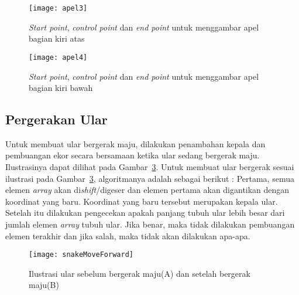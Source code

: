 \begin{figure}[H]
	\centering  
	\texttt{[image: apel3]}  
	\caption[\textit{Start point}, \textit{control point} dan \textit{end point} untuk menggambar apel bagian kiri atas]{\textit{Start point}, \textit{control point} dan \textit{end point} untuk menggambar apel bagian kiri atas}
	\label{fig:apel3} 
\end{figure}

\begin{figure}[H]
	\centering  
	\texttt{[image: apel4]}  
	\caption[\textit{Start point}, \textit{control point} dan \textit{end point} untuk menggambar apel bagian kiri bawah]{\textit{Start point}, \textit{control point} dan \textit{end point} untuk menggambar apel bagian kiri bawah}
	\label{fig:apel4} 
\end{figure}

\subsection{Pergerakan Ular}
Untuk membuat ular bergerak maju, dilakukan penambahan kepala dan pembuangan ekor secara bersamaan ketika ular sedang bergerak maju. Ilustrasinya dapat dilihat pada Gambar~\ref{fig:snakeMoveForward}. Untuk membuat ular bergerak sesuai ilustrasi pada Gambar~\ref{fig:snakeMoveForward}, algoritmanya adalah sebagai berikut : Pertama, semua elemen \textit{array} akan di\textit{shift}/digeser dan elemen pertama akan digantikan dengan koordinat yang baru. Koordinat yang baru tersebut merupakan kepala ular. Setelah itu dilakukan pengecekan apakah panjang tubuh ular lebih besar dari jumlah elemen \textit{array} tubuh ular. Jika benar, maka tidak dilakukan pembuangan elemen terakhir dan jika salah, maka tidak akan dilakukan apa-apa. 

\begin{figure}[H]
	\centering  
	\texttt{[image: snakeMoveForward]}  
	\caption[Ilustrasi ular sebelum bergerak maju(A) dan setelah bergerak maju(B)]{Ilustrasi ular sebelum bergerak maju(A) dan setelah bergerak maju(B)}
	\label{fig:snakeMoveForward} 
\end{figure}

